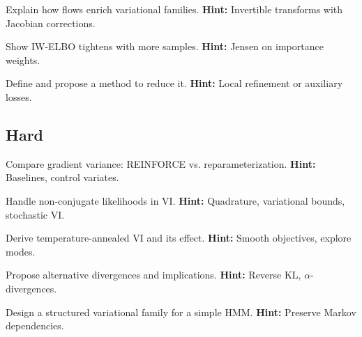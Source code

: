 \begin{problem}
Explain how flows enrich variational families.
\textbf{Hint:} Invertible transforms with Jacobian corrections.
\end{problem}

\begin{problem}
Show IW-ELBO tightens with more samples.
\textbf{Hint:} Jensen on importance weights.
\end{problem}

\begin{problem}
Define and propose a method to reduce it.
\textbf{Hint:} Local refinement or auxiliary losses.
\end{problem}

\subsection*{Hard}
\begin{problem}
Compare gradient variance: REINFORCE vs. reparameterization.
\textbf{Hint:} Baselines, control variates.
\end{problem}

\begin{problem}
Handle non-conjugate likelihoods in VI.
\textbf{Hint:} Quadrature, variational bounds, stochastic VI.
\end{problem}

\begin{problem}[Tempered VI]
Derive temperature-annealed VI and its effect.
\textbf{Hint:} Smooth objectives, explore modes.
\end{problem}

\begin{problem}[KL Alternatives]
Propose alternative divergences and implications.
\textbf{Hint:} Reverse KL, $\alpha$-divergences.
\end{problem}

\begin{problem}[Structured VI]
Design a structured variational family for a simple HMM.
\textbf{Hint:} Preserve Markov dependencies.
\end{problem}


